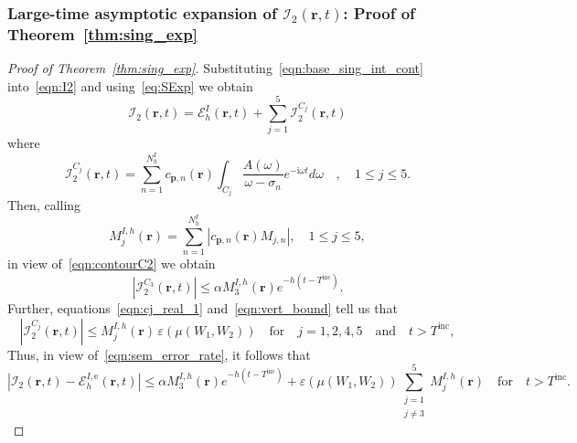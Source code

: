 \documentclass[11pt]{article}
\theoremstyle{plain}
\theoremstyle{remark}
\def \br{\mathbf{r}}
\def \bp{\mathbf{p}}
\begin{document}
\subsubsection{Large-time asymptotic expansion of $\mathcal{I}_2(\br,t)$: Proof of Theorem~\ref{thm:sing_exp}\label{asym-exp}}
\begin{proof}[Proof of Theorem~\ref{thm:sing_exp}]
  Substituting~\eqref{eqn:base_sing_int_cont} into~\eqref{eqn:I2}
  and using~\eqref{eq:SExp} we obtain
 \begin{equation}\label{eqn:sem_error_rate}
  \mathcal{I}_2(\br,t) = \mathcal{E}_h^{I}(\br,t)  + \sum_{j = 1}^5 \mathcal{I}^{C_j}_{2}(\br,t)
\end{equation}
where
\begin{equation}\label{eqn:I2Cj}
  \mathcal{I}^{C_j}_{2}(\br,t) = \sum_{n = 1}^{N_h^{I}}c_{\bp,n}(\br)\int_{C_j} \frac{A(\omega)}{\omega - \sigma_n}e^{-\mathrm{i} \omega t} d\omega\quad,\quad 1 \le j \le 5.
\end{equation}
Then, calling
\begin{equation}\label{MjIh-def}
  M_{j}^{I,h}(\br) = \sum_{n = 1}^{N_h^{I}}|c_{\bp,n}(\br)M_{j,n}|, \quad 1 \le j \le 5,
  \end{equation}
in view of~\eqref{eqn:contourC2} we obtain
\begin{equation}\label{I2C1_bound}
  |\mathcal{I}^{C_3}_{2}(\br,t)| \le  \alpha M^{I,h}_3(\br)e^{-h(t - T^\mathrm{inc})}.
\end{equation}
Further, equations~\eqref{eqn:cj_real_1} and~\eqref{eqn:vert_bound}
tell us that
\begin{equation}\label{I2Cj_bound}
  |\mathcal{I}^{C_j}_{2}(\br,t)| \le  M^{I,h}_j(\br)\, \varepsilon(\mu(W_1,W_2)) \quad \text{for} \quad j = 1,2,4,5 \quad\mbox{and}\quad t > T^\mathrm{inc},
\end{equation}
Thus, in view of~\eqref{eqn:sem_error_rate}, it follows that
\begin{equation}\label{eqn:I2_Asym_err}
  |\mathcal{I}_2(\br,t) - \mathcal{E}_h^{I,\mathrm{e}}(\br,t)| \le  \alpha M^{I,h}_3(\br)e^{-h(t - T^\mathrm{inc})} + \varepsilon(\mu(W_1,W_2))\sum_{\substack{j=1 \\ j \ne 3}}^5M^{I,h}_j(\br) \quad \text{for} \quad t > T^\mathrm{inc}.
\end{equation}


\end{proof}
\end{document}
